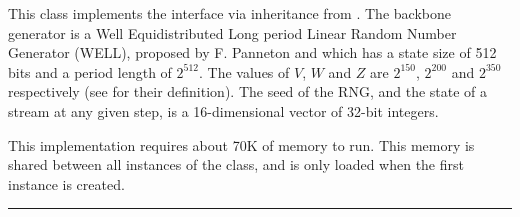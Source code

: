 
This class implements the  interface via inheritance from
. The backbone generator is a Well Equidistributed
Long period Linear Random Number Generator (WELL), proposed by F.
 Panneton\html{,} and which has a state size
of 512 bits and a period length of 
\latex{$\rho\approx$} $2^{512}$. The values of $V$, $W$ and $Z$ are $2^{150}$,
$2^{200}$ and $2^{350}$ respectively (see  for their
definition). The seed of the RNG, and the state of a stream at any given
step, is a 16-dimensional vector of 32-bit integers.

This implementation requires about
70K of memory to run. This memory is shared between all instances of the
class, and is only loaded when the first instance is created.


\bigskip\hrule

